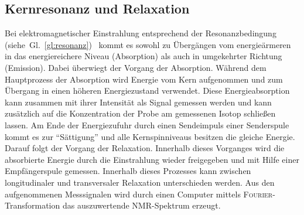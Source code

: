 \subsection*{Kernresonanz und Relaxation}
Bei elektromagnetischer Einstrahlung entsprechend der Resonanzbedingung \newline \mbox{(siehe Gl. \ref{gl:resonanz}) } kommt es sowohl zu Übergängen vom energieärmeren in das energiereichere Niveau (Absorption) als auch in umgekehrter Richtung (Emission). Dabei überwiegt der Vorgang der Absorption. Während dem Hauptprozess der Absorption wird Energie vom Kern aufgenommen und zum Übergang in einen höheren Energiezustand verwendet. Diese Energieabsorption kann zusammen mit ihrer Intensität als Signal gemessen werden und kann zusätzlich auf die Konzentration der Probe am gemessenen Isotop schließen lassen. Am Ende der Energiezufuhr durch einen Sendeimpuls einer Senderspule kommt es zur "`Sättigung"' und alle Kernspinniveaus  besitzen die gleiche Energie. Darauf folgt der Vorgang der Relaxation. Innerhalb dieses Vorganges wird die absorbierte Energie durch die Einstrahlung wieder freigegeben und mit Hilfe einer Empfängerspule gemessen. Innerhalb dieses Prozesses kann zwischen longitudinaler und transversaler Relaxation unterschieden werden. Aus den aufgenommenen Messsignalen wird durch einen Computer mittels \textsc{Fourier}-Transformation das auszuwertende NMR-Spektrum erzeugt.